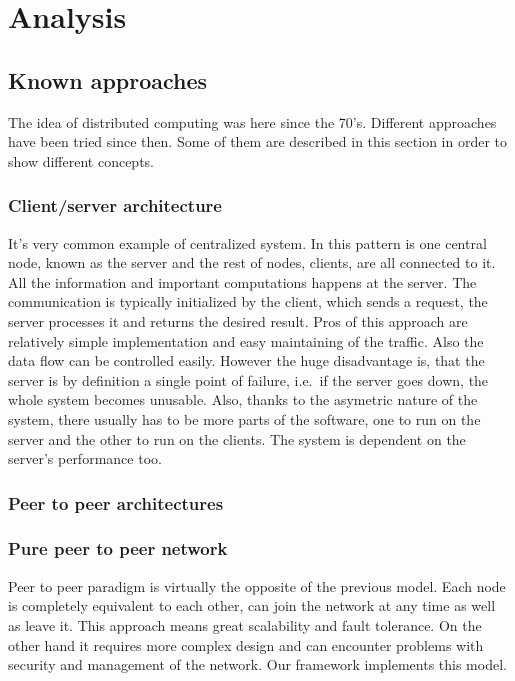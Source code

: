 \chapter{Analysis}\label{analysis}

\section{Known approaches}\label{known-approaches}

The idea of distributed computing was here since the 70's. Different
approaches have been tried since then. Some of them are described in
this section in order to show different concepts.

\subsection{Client/server architecture}\label{clientserver-architecture}

It's very common example of centralized system. In this pattern is one
central node, known as the server and the rest of nodes, clients, are
all connected to it. All the information and important computations
happens at the server. The communication is typically initialized by the
client, which sends a request, the server processes it and returns the
desired result. Pros of this approach are relatively simple
implementation and easy maintaining of the traffic. Also the data flow
can be controlled easily. However the huge disadvantage is, that the
server is by definition a single point of failure, i.e.~if the server
goes down, the whole system becomes unusable. Also, thanks to the
asymetric nature of the system, there usually has to be more parts of
the software, one to run on the server and the other to run on the
clients. The system is dependent on the server's performance too.

\subsection{Peer to peer
architectures}\label{peer-to-peer-architectures}

\subsection*{Pure peer to peer network}

Peer to peer paradigm is virtually the opposite of the previous model.
Each node is completely equivalent to each other, can join the network
at any time as well as leave it. This approach means great scalability
and fault tolerance. On the other hand it requires more complex design
and can encounter problems with security and management of the network.
Our framework implements this model.

